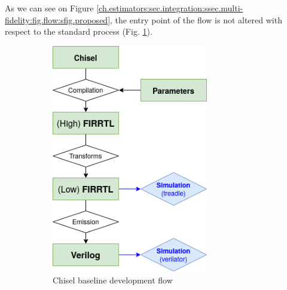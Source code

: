         As we can see on Figure \ref{ch.estimators:sec.integration:ssec.multi-fidelity:fig.flow:sfig.proposed}, the entry point of the flow is not altered with respect to the standard \chisel{} process (Fig. \ref{ch.estimators:sec.integration:ssec.multi-fidelity:fig.flow:sfig.original}).

\clearpage
        \begin{figure}[h!]
            \vspace{-0.1cm}
            \begin{subfigure}{0.49\textwidth}
                \centering
                \includegraphics[width=0.75\textwidth]{Figures/chisel-flow-original.png}
                \vspace{3.5em}
                \caption{Chisel baseline development flow}
                \label{ch.estimators:sec.integration:ssec.multi-fidelity:fig.flow:sfig.original}
            \end{subfigure}
            ~
            \begin{subfigure}{0.49\textwidth}
                \centering

\end{subfigure}
\end{figure}
